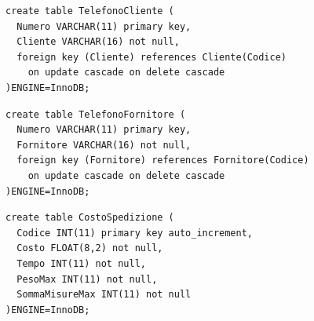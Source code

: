 \begin{verbatim}
create table TelefonoCliente (
  Numero VARCHAR(11) primary key,
  Cliente VARCHAR(16) not null,
  foreign key (Cliente) references Cliente(Codice)
    on update cascade on delete cascade
)ENGINE=InnoDB;
\end{verbatim}
\vspace{0.5cm}

\noindent{}
\newline\newline

\begin{verbatim}
create table TelefonoFornitore (
  Numero VARCHAR(11) primary key,
  Fornitore VARCHAR(16) not null,
  foreign key (Fornitore) references Fornitore(Codice)
    on update cascade on delete cascade
)ENGINE=InnoDB;
\end{verbatim}
\vspace{0.5cm}

\noindent{}
\newline\newline

\begin{verbatim}
create table CostoSpedizione (
  Codice INT(11) primary key auto_increment,
  Costo FLOAT(8,2) not null,
  Tempo INT(11) not null,
  PesoMax INT(11) not null,
  SommaMisureMax INT(11) not null
)ENGINE=InnoDB;
\end{verbatim}
\vspace{0.5cm}

